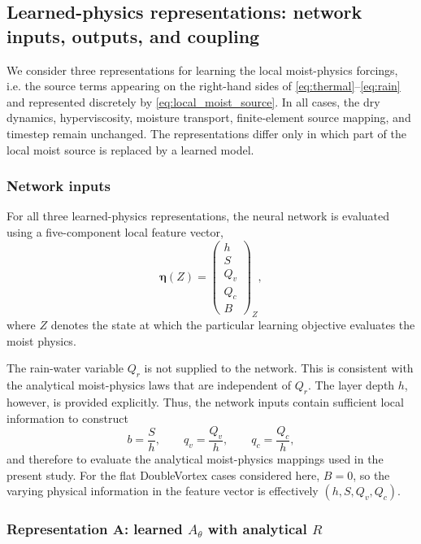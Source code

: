 \documentclass[12pt]{article}
\begin{document}
\subsection{Learned-physics representations: network inputs, outputs, and coupling}

We consider three representations for learning the local moist-physics
forcings, i.e. the source terms appearing on the right-hand sides of
\eqref{eq:thermal}--\eqref{eq:rain} and represented discretely by
\eqref{eq:local_moist_source}. In all cases, the dry dynamics,
hyperviscosity, moisture transport, finite-element source mapping, and
timestep remain unchanged. The representations differ only in which part
of the local moist source is replaced by a learned model.

\subsubsection{Network inputs}

For all three learned-physics representations, the neural network is evaluated
using a five-component local feature vector,
\begin{equation}
	\boldsymbol{\eta}(Z)
	=
	\begin{pmatrix}
		h\\
		S\\
		Q_v\\
		Q_c\\
		B
	\end{pmatrix}_{Z},
	\label{eq:current_network_inputs}
\end{equation}
where $Z$ denotes the state at which the particular learning objective
evaluates the moist physics. 

The rain-water variable $Q_r$ is not supplied to the network. This is
consistent with the analytical moist-physics laws that are independent of $Q_r$. The layer depth $h$, however, is
provided explicitly. Thus, the network inputs contain sufficient
local information to construct
\begin{equation}
	b=\frac{S}{h},
	\qquad
	q_v=\frac{Q_v}{h},
	\qquad
	q_c=\frac{Q_c}{h},
\end{equation}
and therefore to evaluate the analytical moist-physics mappings used in the
present study. For the flat DoubleVortex cases considered here, $B=0$, so
the varying physical information in the feature vector is effectively
$(h,S,Q_v,Q_c)$.

\subsubsection{Representation A: learned $A_\theta$ with analytical $R$}
\end{document}
